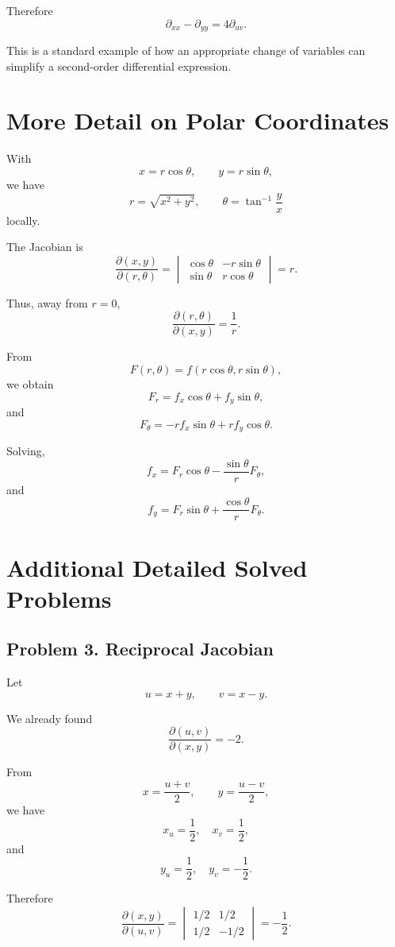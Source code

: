\documentclass[11pt,oneside]{book}
\theoremstyle{studentthm}
\theoremstyle{definition}
\begin{document}
Therefore
\[
\partial_{xx}-\partial_{yy}
=
4\partial_{uv}.
\]

This is a standard example of how an appropriate change of variables
can simplify a second-order differential expression.

\section{More Detail on Polar Coordinates}

With
\[
x=r\cos\theta,
\qquad
y=r\sin\theta,
\]
we have
\[
r=\sqrt{x^2+y^2},
\qquad
\theta=\tan^{-1}\frac{y}{x}
\]
locally.

The Jacobian is
\[
\frac{\partial(x,y)}{\partial(r,\theta)}
=
\begin{vmatrix}
\cos\theta&-r\sin\theta\\
\sin\theta&r\cos\theta
\end{vmatrix}
=r.
\]

Thus, away from \(r=0\),
\[
\frac{\partial(r,\theta)}{\partial(x,y)}
=
\frac1r.
\]

From
\[
F(r,\theta)
=
f(r\cos\theta,r\sin\theta),
\]
we obtain
\[
F_r=f_x\cos\theta+f_y\sin\theta,
\]
and
\[
F_\theta
=
-rf_x\sin\theta
+
rf_y\cos\theta.
\]

Solving,
\[
f_x
=
F_r\cos\theta
-
\frac{\sin\theta}{r}F_\theta,
\]
and
\[
f_y
=
F_r\sin\theta
+
\frac{\cos\theta}{r}F_\theta.
\]

\section{Additional Detailed Solved Problems}

\subsection*{Problem 3. Reciprocal Jacobian}

Let
\[
u=x+y,\qquad v=x-y.
\]

We already found
\[
\frac{\partial(u,v)}{\partial(x,y)}
=-2.
\]

From
\[
x=\frac{u+v}{2},
\qquad
y=\frac{u-v}{2},
\]
we have
\[
x_u=\frac12,\quad x_v=\frac12,
\]
and
\[
y_u=\frac12,\quad y_v=-\frac12.
\]

Therefore
\[
\frac{\partial(x,y)}{\partial(u,v)}
=
\begin{vmatrix}
1/2&1/2\\
1/2&-1/2
\end{vmatrix}
=
-\frac12.
\]
\end{document}
